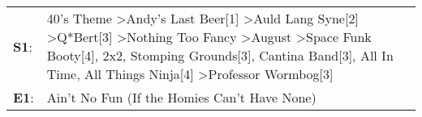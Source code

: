 \begin{supertabular}{p{0.03\textwidth}p{0.92\textwidth}}
 \textbf{S1}:  &  40's Theme\textsuperscript{} \textgreater \enspace Andy's Last Beer[1]\textsuperscript{} \textgreater \enspace Auld Lang Syne[2]\textsuperscript{} \textgreater \enspace Q*Bert[3]\textsuperscript{} \textgreater \enspace Nothing Too Fancy\textsuperscript{} \textgreater \enspace August\textsuperscript{} \textgreater \enspace Space Funk Booty[4]\textsuperscript{}, \enspace 2x2\textsuperscript{}, \enspace Stomping Grounds[3]\textsuperscript{}, \enspace Cantina Band[3]\textsuperscript{}, \enspace All In Time\textsuperscript{}, \enspace All Things Ninja[4]\textsuperscript{} \textgreater \enspace Professor Wormbog[3]\textsuperscript{}  \enspace  \\
 \textbf{E1}:  &                                                                                                                                                                                                                                                                                                                                                                                                                                                                                                                                                                                              Ain't No Fun (If the Homies Can't Have None)\textsuperscript{}  \enspace  \\
\end{supertabular}
